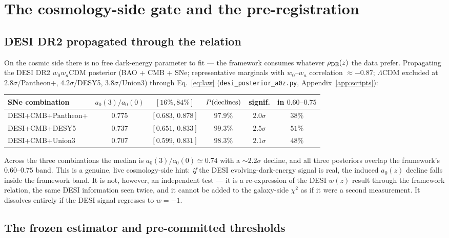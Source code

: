 \documentclass[11pt,a4paper]{article}
\newcommand{\rhoDE}{\rho_{\rm DE}}
\newcommand{\azero}{a_0}
\begin{document}
\section{The cosmology-side gate and the pre-registration}
\label{sec:gate}

\subsection{DESI DR2 propagated through the relation}
\label{sec:desi}

On the cosmic side there is no free dark-energy parameter to fit --- the
framework consumes whatever $\rhoDE(z)$ the data prefer. Propagating the DESI
DR2 \cite{DESI2025} $w_0w_a$CDM posterior (BAO + CMB + SNe; representative
marginals with $w_0$--$w_a$ correlation $\approx-0.87$; $\Lambda$CDM excluded
at $2.8\sigma$/Pantheon+, $4.2\sigma$/DESY5, $3.8\sigma$/Union3) through
Eq.~\eqref{eq:law} (\texttt{desi\_posterior\_a0z.py},
Appendix~\ref{app:scripts}):

\begin{center}
\begin{tabular}{lccccc}
\toprule
SNe combination & $\azero(3)/\azero(0)$ & $[16\%,84\%]$ & $P({\rm declines})$ & signif. & in $0.60$--$0.75$\\
\midrule
DESI+CMB+Pantheon+ & $0.775$ & $[0.683,\,0.878]$ & $97.9\%$ & $2.0\sigma$ & $38\%$\\
DESI+CMB+DESY5 & $0.737$ & $[0.651,\,0.833]$ & $99.3\%$ & $2.5\sigma$ & $51\%$\\
DESI+CMB+Union3 & $0.707$ & $[0.599,\,0.831]$ & $98.3\%$ & $2.1\sigma$ & $48\%$\\
\bottomrule
\end{tabular}
\end{center}

Across the three combinations the median is $\azero(3)/\azero(0)\simeq0.74$
with a $\sim2.2\sigma$ decline, and all three posteriors overlap the
framework's $0.60$--$0.75$ band. This is a genuine, live cosmology-side hint:
\emph{if} the DESI evolving-dark-energy signal is real, the induced
$\azero(z)$ decline falls inside the framework band. It is not, however, an
independent test --- it is a re-expression of the DESI $w(z)$ result through
the framework relation, the same DESI information seen twice, and it cannot be
added to the galaxy-side $\chi^2$ as if it were a second measurement. It
dissolves entirely if the DESI signal regresses to $w=-1$.

\subsection{The frozen estimator and pre-committed thresholds}
\label{sec:frozen}
\end{document}
